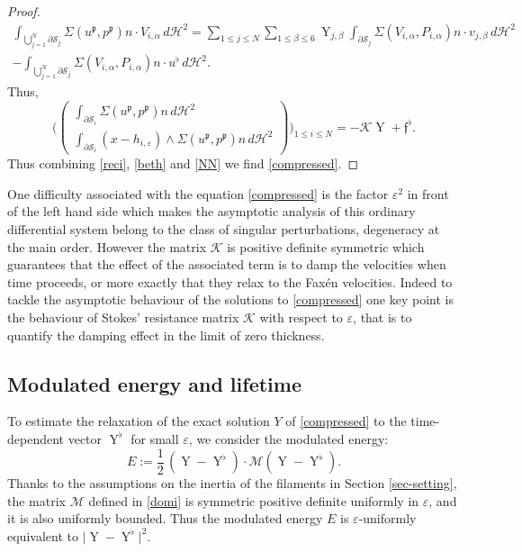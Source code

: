 \documentclass[10pt]{amsart}
\let\eps\varepsilon
\DeclareMathOperator{\Y}{Y}
\theoremstyle{definition}
\theoremstyle{remark}
\let\oldbigcup\bigcup
\begin{document}
\begin{proof}
\begin{multline*}
\int_{\oldbigcup_{j=1}^N \partial \mathcal S_j }
\Sigma(u^\mathfrak{p}, p^\mathfrak{p}) n \cdot V_{i,\alpha} \, d\mathcal{H}^2=
\sum_{1 \leq j \leq N} \sum_{1\leq \beta \leq 6} \Y_{j,\beta } \int_{\partial \mathcal S_j }
\Sigma(V_{i,\alpha}, P_{i,\alpha}) n \cdot v_{j,\beta} \, d\mathcal{H}^2
\\ 
-\int_{\oldbigcup_{j=1}^N \partial \mathcal S_j } \Sigma(V_{i,\alpha}, P_{i,\alpha}) n \cdot u^\flat \, d\mathcal{H}^2.
\end{multline*}
Thus,
\begin{equation}
\label{reci}
\biggl(\begin{pmatrix}
\int_{\partial \mathcal S_i } \Sigma(u^\mathfrak{p}, p^\mathfrak{p}) n \, d\mathcal{H}^2 \\
\int_{\partial \mathcal S_i} (x - h_{i,\eps}) \wedge \Sigma(u^\mathfrak{p}, p^\mathfrak{p}) n \, d\mathcal{H}^2
\end{pmatrix}\biggr)_{1 \leq i \leq N}
=
- \mathcal K \Y
+ \mathfrak{f}^\flat.
\end{equation}
Thus combining \eqref{reci}, \eqref{beth} and \eqref{NN}
we find \eqref{compressed}.
\end{proof}

One difficulty associated with the equation \eqref{compressed}
is the factor $\eps^2$ in front of the left hand side which makes the asymptotic analysis of this ordinary differential system belong to the class of singular perturbations, \ie degeneracy at the main order.
However the matrix $\mathcal K$ is positive definite symmetric which guarantees that the effect of the associated term is to damp the velocities when time proceeds, or more exactly that they relax to the Faxén velocities.
Indeed to tackle the asymptotic behaviour of the solutions to \eqref{compressed}
one key point is the behaviour of Stokes' resistance matrix $\mathcal K$ with respect to $\eps$, that is to quantify the damping effect in the limit of zero thickness.

\subsection{Modulated energy and lifetime}
\label{section-modu}

To estimate the relaxation of the exact solution $Y$ of \eqref{compressed}
to the time-dependent vector $\Y^\flat$
for small $\eps$, we consider the modulated energy:
\begin{equation}
E := \frac 1 2\, (\Y - \Y^\flat) \cdot \mathcal{M} (\Y - \Y^\flat).
\end{equation}
Thanks to the assumptions on the inertia of the filaments in
Section
\ref{sec-setting}, the matrix $\mathcal{M}$ defined in \eqref{domi} is symmetric positive definite uniformly in $\eps$, and it is also
uniformly bounded. Thus the modulated energy $E$ is $\eps$-uniformly equivalent to $\vert \Y - \Y^\flat \vert^2$.
\end{document}
